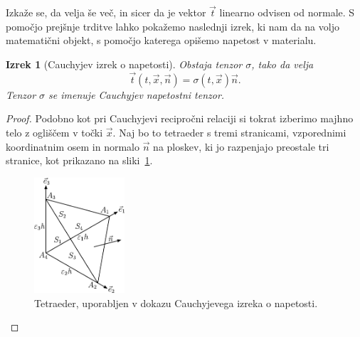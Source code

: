 \documentclass[12pt,a4paper,twoside]{article}
\theoremstyle{definition} %
\theoremstyle{plain} %
\newtheorem{izrek}[definicija]{Izrek}
\numberwithin{equation}{section}
\newcommand{\vt}{\vec{t}}
\newcommand{\vn}{\vec{n}}
\newcommand{\vx}{\vec{x}}
\newcommand{\ts}{\sigma}
\begin{document}
Izkaže se, da velja še več, in sicer da je vektor $\vt$ linearno odvisen od normale. S pomočjo
prejšnje trditve lahko pokažemo naslednji izrek, ki nam da na voljo matematični objekt, s pomočjo
katerega opišemo napetost v materialu.
\begin{izrek}[Cauchyjev izrek o napetosti]
  Obstaja tenzor $\ts$, tako da velja
  \begin{equation}
    \vt(t, \vx, \vn) = \ts(t, \vx)\vn.
  \end{equation}
  Tenzor $\ts$ se imenuje Cauchyjev napetostni tenzor.
\end{izrek}
\begin{proof}
Podobno kot pri Cauchyjevi recipročni relaciji si tokrat izberimo majhno telo z ogliščem v točki
$\vx$. Naj bo to tetraeder s tremi stranicami, vzporednimi koordinatnim osem in normalo $\vn$ na
ploskev, ki jo razpenjajo preostale tri stranice, kot prikazano na sliki~\ref{fig:tetra}.

\begin{figure}[h]
  \centering
  \includegraphics[width=0.3\textwidth]{images/cauchy_tetrahedron.pdf}
  \caption{Tetraeder, uporabljen v dokazu Cauchyjevega izreka o napetosti.}
  \label{fig:tetra}
\end{figure}


\end{proof}
\end{document}
